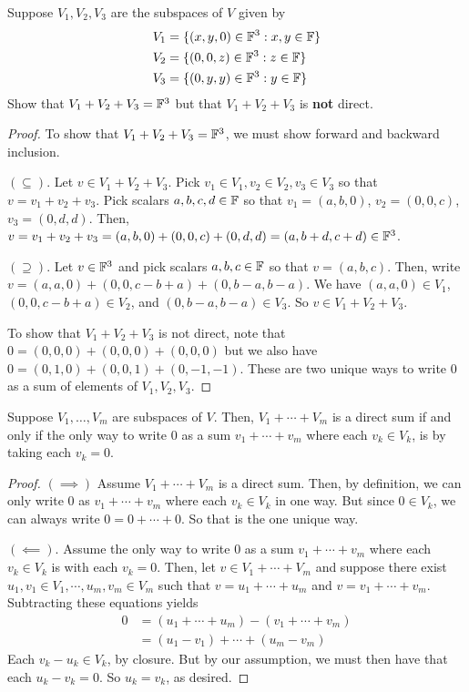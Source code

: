 \begin{example}
    Suppose $V_1,V_2,V_3$ are the subspaces of $V$ given by
    \begin{align*}
        V_1 &= \{(x,y,0)\in \mathbb F^3: x,y\in \mathbb F \} \\
        V_2 &= \{(0,0,z)\in\mathbb F^3 : z\in \mathbb F \} \\
        V_3 &= \{(0,y,y)\in \mathbb F^3 : y\in \mathbb F \}
    \end{align*}
    Show that $V_1+V_2+V_3 = \mathbb F^3$ but that $V_1+V_2+V_3$ is \textbf{not} direct.
\end{example}
\begin{proof}
    To show that $V_1+V_2+V_3 = \mathbb F^3$, we must show forward and backward inclusion.

    $(\subseteq).$ Let $v\in V_1 + V_2 + V_3$. Pick $v_1 \in V_1, v_2\in V_2, v_3\in V_3$ so that $v = v_1 + v_2 +v_3$. Pick scalars $a,b,c,d\in \mathbb F$ so that $v_1 = (a,b,0)$, $v_2 = (0,0,c)$, $v_3 = (0,d,d)$. Then, $v = v_1+v_2+v_3 = (a,b,0) + (0,0,c) + (0,d,d) = (a,b+d, c+d)\in\mathbb F^3$.

    $(\supseteq)$. Let $v\in\mathbb F^3$ and pick scalars $a,b,c\in \mathbb F$ so that $v = (a,b,c)$. Then, write $v = (a,a,0) + (0,0, c - b+a) + (0,b-a, b-a)$. We have $(a,a,0)\in V_1$, $(0,0,c-b+a)\in V_2$, and $(0,b-a, b-a)\in V_3$. So $v \in V_1+V_2+V_3$.

    To show that $V_1+V_2+V_3$ is not direct, note that $0 = (0,0,0) + (0,0,0) + (0,0,0)$ but we also have $0 = (0,1,0) + (0,0,1) + (0,-1,-1)$. These are two unique ways to write $0$ as a sum of elements of $V_1, V_2, V_3$.
\end{proof}
\begin{theorem} \label{direct sum all 0}
    Suppose $V_1, \dots, V_m$ are subspaces of $V$. Then, $V_1 + \cdots + V_m$ is a direct sum if and only if the only way to write $0$ as a sum $v_1 + \cdots + v_m$ where each $v_k \in V_k$, is by taking each $v_k = 0$.
\end{theorem}
\begin{proof}
    $(\implies)$ Assume $V_1 + \cdots + V_m$ is a direct sum. Then, by definition, we can only write $0$ as $v_1 + \cdots + v_m$ where each $v_k \in V_k$ in one way. But since $0\in V_k$, we can always write $0 = 0 + \cdots + 0$. So that is the one unique way.

    $(\impliedby)$. Assume the only way to write $0$ as a sum $v_1 + \cdots + v_m$ where each $v_k\in V_k$ is with each $v_k = 0$. Then, let $v\in V_1 + \cdots + V_m$ and suppose there exist $u_1,v_1\in V_1, \cdots, u_m, v_m\in V_m$ such that $v = u_1 + \cdots + u_m$ and $v = v_1 + \cdots + v_m$. Subtracting these equations yields
    \begin{align*}
         0 &= (u_1 + \cdots + u_m) - (v_1 + \cdots + v_m) \\
         &= (u_1 - v_1) + \cdots + (u_m - v_m)
    \end{align*}
    Each $v_k - u_k \in V_k$, by closure. But by our assumption, we must then have that each $u_k - v_k = 0$. So $u_k = v_k$, as desired.
\end{proof} 

